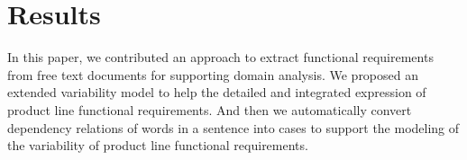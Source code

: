 \section{Results}
\begin{minipage}{\linewidth}
	\begin{multicols*}{2}
		In this paper, we contributed an approach to extract functional requirements from free text documents for supporting domain analysis. We proposed an extended variability model to help the detailed and integrated expression of product line functional requirements. And then we automatically convert dependency relations of words in a sentence into cases to support the modeling of the variability of product line functional requirements.

		
	\end{multicols*}
\end{minipage}
